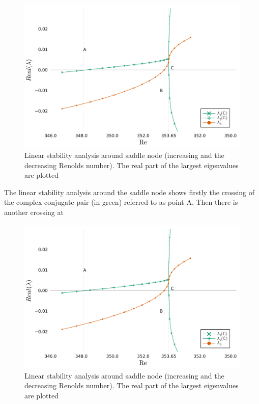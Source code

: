 \begin{figure}[h!]
  \begin{center}
  \includegraphics[width=0.6*\textwidth]{figs/lsa_sn}
  \end{center}
  \label{fig:lsa}
  \caption{Linear stability analysis around saddle node (increasing and the decreasing Renolds number). The real
    part of the largest eigenvalues are plotted} 
\end{figure}


The linear stability analysis around the saddle node shows firstly the crossing
of the complex conjugate pair (in green) referred to as point A. Then there is
another crossing at 

\begin{figure}[h!]
  \begin{center}
  \includegraphics[width=0.6*\textwidth]{figs/lsa_sn}
  \end{center}
  \label{fig:lsa}
  \caption{Linear stability analysis around saddle node (increasing and the decreasing Renolds number). The real
    part of the largest eigenvalues are plotted} 
\end{figure}

